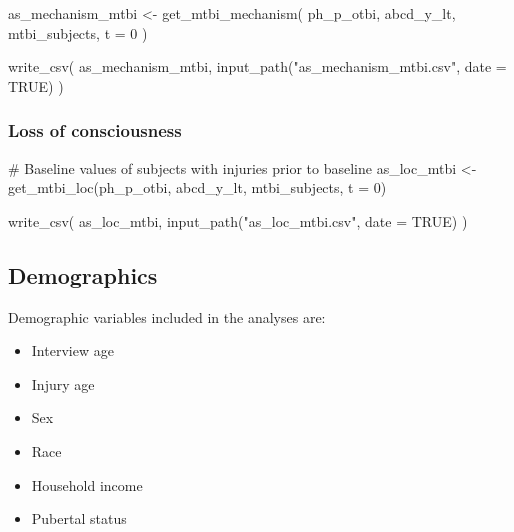 \documentclass[
  letterpaper,
  DIV=11,
  numbers=noendperiod]{scrreprt}
\newenvironment{Shaded}{\begin{snugshade}}{\end{snugshade}}
\newcommand{\AttributeTok}[1]{\textcolor[rgb]{0.40,0.45,0.13}{#1}}
\newcommand{\CommentTok}[1]{\textcolor[rgb]{0.37,0.37,0.37}{#1}}
\newcommand{\ConstantTok}[1]{\textcolor[rgb]{0.56,0.35,0.01}{#1}}
\newcommand{\DecValTok}[1]{\textcolor[rgb]{0.68,0.00,0.00}{#1}}
\newcommand{\FunctionTok}[1]{\textcolor[rgb]{0.28,0.35,0.67}{#1}}
\newcommand{\NormalTok}[1]{\textcolor[rgb]{0.00,0.23,0.31}{#1}}
\newcommand{\OtherTok}[1]{\textcolor[rgb]{0.00,0.23,0.31}{#1}}
\newcommand{\StringTok}[1]{\textcolor[rgb]{0.13,0.47,0.30}{#1}}
\providecommand{\tightlist}{%
  \setlength{\itemsep}{0pt}\setlength{\parskip}{0pt}}\usepackage{longtable,booktabs,array}
\begin{document}
\begin{Shaded}
\begin{Highlighting}[]
\NormalTok{as\_mechanism\_mtbi }\OtherTok{\textless{}{-}} \FunctionTok{get\_mtbi\_mechanism}\NormalTok{(}
\NormalTok{    ph\_p\_otbi,}
\NormalTok{    abcd\_y\_lt,}
\NormalTok{    mtbi\_subjects,}
    \AttributeTok{t =} \DecValTok{0}
\NormalTok{)}

\FunctionTok{write\_csv}\NormalTok{(}
\NormalTok{    as\_mechanism\_mtbi,}
    \FunctionTok{input\_path}\NormalTok{(}\StringTok{"as\_mechanism\_mtbi.csv"}\NormalTok{, }\AttributeTok{date =} \ConstantTok{TRUE}\NormalTok{)}
\NormalTok{)}
\end{Highlighting}
\end{Shaded}

\subsubsection{Loss of consciousness}\label{loss-of-consciousness}

\begin{Shaded}
\begin{Highlighting}[]
\CommentTok{\# Baseline values of subjects with injuries prior to baseline}
\NormalTok{as\_loc\_mtbi }\OtherTok{\textless{}{-}} \FunctionTok{get\_mtbi\_loc}\NormalTok{(ph\_p\_otbi, abcd\_y\_lt, mtbi\_subjects, }\AttributeTok{t =} \DecValTok{0}\NormalTok{)}

\FunctionTok{write\_csv}\NormalTok{(}
\NormalTok{    as\_loc\_mtbi,}
    \FunctionTok{input\_path}\NormalTok{(}\StringTok{"as\_loc\_mtbi.csv"}\NormalTok{, }\AttributeTok{date =} \ConstantTok{TRUE}\NormalTok{)}
\NormalTok{)}
\end{Highlighting}
\end{Shaded}

\subsection{Demographics}\label{demographics}

Demographic variables included in the analyses are:

\begin{itemize}
\tightlist
\item
  Interview age
\item
  Injury age
\item
  Sex
\item
  Race
\item
  Household income
\item
  Pubertal status
\end{itemize}
\end{document}
